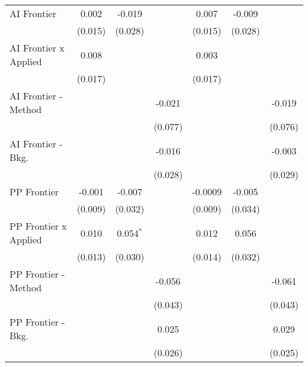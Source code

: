 \begin{tabular}{lcccccc}
   AI Frontier                    & 0.002          & -0.019       &             & 0.007          & -0.009       &   \\   
                                  & (0.015)        & (0.028)      &             & (0.015)        & (0.028)      &   \\   
   AI Frontier x Applied          & 0.008          &              &             & 0.003          &              &   \\   
                                  & (0.017)        &              &             & (0.017)        &              &   \\   
   AI Frontier - Method           &                &              & -0.021      &                &              & -0.019\\   
                                  &                &              & (0.077)     &                &              & (0.076)\\   
   AI Frontier - Bkg.             &                &              & -0.016      &                &              & -0.003\\   
                                  &                &              & (0.028)     &                &              & (0.029)\\   
   PP Frontier                    & -0.001         & -0.007       &             & -0.0009        & -0.005       &   \\   
                                  & (0.009)        & (0.032)      &             & (0.009)        & (0.034)      &   \\   
   PP Frontier x Applied          & 0.010          & 0.054$^{*}$  &             & 0.012          & 0.056        &   \\   
                                  & (0.013)        & (0.030)      &             & (0.014)        & (0.032)      &   \\   
   PP Frontier - Method           &                &              & -0.056      &                &              & -0.061\\   
                                  &                &              & (0.043)     &                &              & (0.043)\\   
   PP Frontier - Bkg.             &                &              & 0.025       &                &              & 0.029\\   
                                  &                &              & (0.026)     &                &              & (0.025)\\   

\end{tabular}
